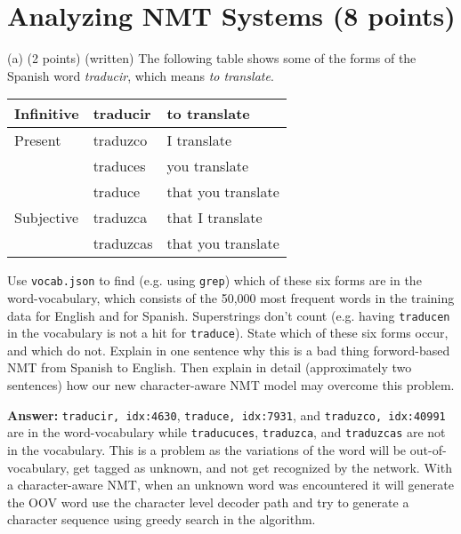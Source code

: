 \documentclass{article}
\begin{document}
\section{Analyzing NMT Systems (8 points)}
\bigbreak
(a) (2 points) (written) The following table shows some of the forms of the Spanish word \emph{traducir}, which means \emph{to translate}.
\begin{center}
    \begin{tabular}{ l l l } 
        \hline
        \textbf{Infinitive} & \textbf{traducir} & \textbf{to translate} \\ 
        \hline
        Present & traduzco & I translate \\
        & traduces & you translate \\
        & traduce & that you translate \\
        \hline
        Subjective & traduzca & that I translate \\
         & traduzcas& that you translate\\
        \hline
    \end{tabular}
\end{center}
Use \verb|vocab.json| to find (e.g. using \verb|grep|) which of these six forms are in the word-vocabulary, which consists of the 50,000 most frequent words in the training data for English and for Spanish. Superstrings don’t count (e.g.  having \verb|traducen| in the vocabulary is not a hit for \verb|traduce|).  State which of these six forms occur, and which do not.  Explain in one sentence why this is a bad thing forword-based NMT from Spanish to English.  Then explain in detail (approximately two sentences) how our new character-aware NMT model may overcome this problem.

\smallbreak
\noindent
\textbf{Answer:} \verb|traducir, idx:4630|, \verb|traduce, idx:7931|, and \verb|traduzco, idx:40991| are in the word-vocabulary while \verb|traducuces|, \verb|traduzca|, and \verb|traduzcas| are not in the vocabulary. This is a problem as the variations of the word will be out-of-vocabulary, get tagged as unknown, and not get recognized by the network. With a character-aware NMT, when an unknown word was encountered it will generate the OOV word use the character level decoder path and try to generate a character sequence using greedy search in the algorithm.
\end{document}
